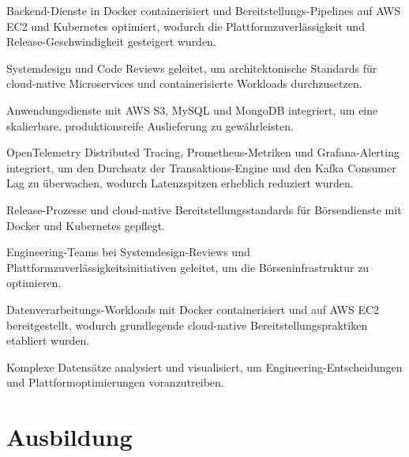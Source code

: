 \documentclass[10pt,a4paper]{resume}
\begin{document}
\bullets
  \item Backend-Dienste in Docker containerisiert und Bereitstellungs-Pipelines auf AWS EC2 und Kubernetes optimiert, wodurch die Plattformzuverlässigkeit und Release-Geschwindigkeit gesteigert wurden.
  \item Systemdesign und Code Reviews geleitet, um architektonische Standards für cloud-native Microservices und containerisierte Workloads durchzusetzen.
  \item Anwendungsdienste mit AWS S3, MySQL und MongoDB integriert, um eine skalierbare, produktionsreife Auslieferung zu gewährleisten.
\bulletsend
\vspace{1.5pt}
\bullets
  \item OpenTelemetry Distributed Tracing, Prometheus-Metriken und Grafana-Alerting integriert, um den Durchsatz der Transaktions-Engine und den Kafka Consumer Lag zu überwachen, wodurch Latenzspitzen erheblich reduziert wurden.
  \item Release-Prozesse und cloud-native Bereitstellungsstandards für Börsendienste mit Docker und Kubernetes gepflegt.
  \item Engineering-Teams bei Systemdesign-Reviews und Plattformzuverlässigkeitsinitiativen geleitet, um die Börseninfrastruktur zu optimieren.
\bulletsend
\vspace{1.5pt}
\bullets
  \item Datenverarbeitungs-Workloads mit Docker containerisiert und auf AWS EC2 bereitgestellt, wodurch grundlegende cloud-native Bereitstellungspraktiken etabliert wurden.
  \item Komplexe Datensätze analysiert und visualisiert, um Engineering-Entscheidungen und Plattformoptimierungen voranzutreiben.
\bulletsend
\vspace{1.5pt}

\section{Ausbildung}

\vspace{2pt}
\end{document}
